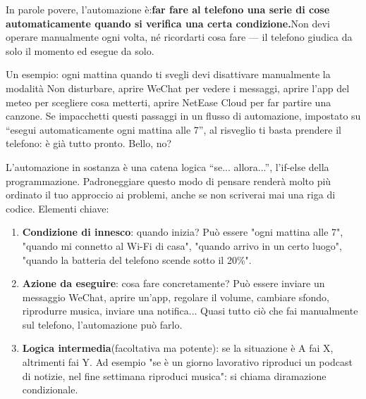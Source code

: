 


In parole povere, l'automazione è:\textbf{far fare al telefono una serie di cose automaticamente quando si verifica una certa condizione.}Non devi operare manualmente ogni volta, né ricordarti cosa fare — il telefono giudica da solo il momento ed esegue da solo.

Un esempio: ogni mattina quando ti svegli devi disattivare manualmente la modalità Non disturbare, aprire WeChat per vedere i messaggi, aprire l'app del meteo per scegliere cosa metterti, aprire NetEase Cloud per far partire una canzone. Se impacchetti questi passaggi in un flusso di automazione, impostato su “esegui automaticamente ogni mattina alle 7”, al risveglio ti basta prendere il telefono: è già tutto pronto. Bello, no?

L'automazione in sostanza è una catena logica “se... allora...”, l'if-else della programmazione. Padroneggiare questo modo di pensare renderà molto più ordinato il tuo approccio ai problemi, anche se non scriverai mai una riga di codice. Elementi chiave:

\begin{enumerate}
  \item \textbf{Condizione di innesco}: quando inizia? Può essere "ogni mattina alle 7", "quando mi connetto al Wi-Fi di casa", "quando arrivo in un certo luogo", "quando la batteria del telefono scende sotto il 20\%".
  \item \textbf{Azione da eseguire}: cosa fare concretamente? Può essere inviare un messaggio WeChat, aprire un'app, regolare il volume, cambiare sfondo, riprodurre musica, inviare una notifica... Quasi tutto ciò che fai manualmente sul telefono, l'automazione può farlo.
  \item \textbf{Logica intermedia}(facoltativa ma potente): se la situazione è A fai X, altrimenti fai Y. Ad esempio "se è un giorno lavorativo riproduci un podcast di notizie, nel fine settimana riproduci musica": si chiama diramazione condizionale.
\end{enumerate}

